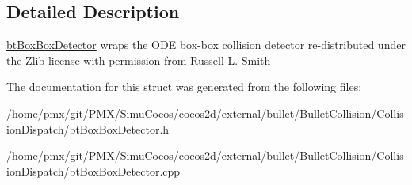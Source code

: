 \subsection{Detailed Description}
\hyperlink{structbtBoxBoxDetector}{bt\+Box\+Box\+Detector} wraps the O\+DE box-\/box collision detector re-\/distributed under the Zlib license with permission from Russell L. Smith 

The documentation for this struct was generated from the following files\+:\begin{DoxyCompactItemize}
\item 
/home/pmx/git/\+P\+M\+X/\+Simu\+Cocos/cocos2d/external/bullet/\+Bullet\+Collision/\+Collision\+Dispatch/bt\+Box\+Box\+Detector.\+h\item 
/home/pmx/git/\+P\+M\+X/\+Simu\+Cocos/cocos2d/external/bullet/\+Bullet\+Collision/\+Collision\+Dispatch/bt\+Box\+Box\+Detector.\+cpp\end{DoxyCompactItemize}
